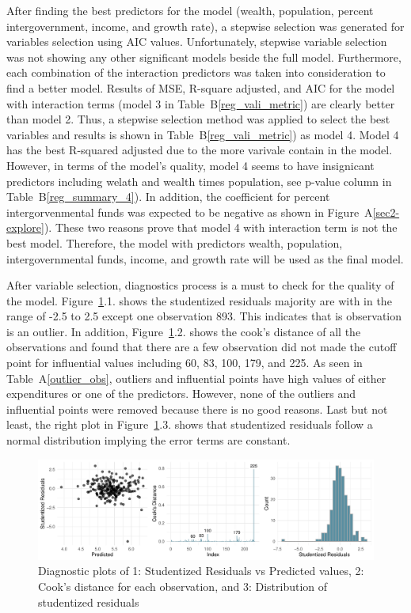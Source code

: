 \documentclass[11pt]{article}\usepackage[]{graphicx}\usepackage[]{color}
\makeatletter
\def\maxwidth{ %
  \ifdim\Gin@nat@width>\linewidth
    \linewidth
  \else
    \Gin@nat@width
  \fi
}
\makeatother
\begin{document}
\noindent After finding the best predictors for the model (wealth, population, percent intergovernment, income, and growth rate), a stepwise selection was generated for variables selection using AIC values. Unfortunately, stepwise variable selection was not showing any other significant models beside the full model. Furthermore, each combination of the interaction predictors was taken into consideration to find a better model. Results of MSE, R-square adjusted, and AIC for the model with interaction terms (model 3 in Table~B\ref{reg_vali_metric}) are clearly better than model 2. Thus, a stepwise selection method was applied to select the best variables and results is shown in Table~B\ref{reg_vali_metric}) as model 4. Model 4 has the best R-squared adjusted due to the more varivale contain in the model. However, in terms of the model's quality, model 4 seems to have insignicant predictors including welath and wealth times population, see p-value column in Table~B\ref{reg_summary_4}). In addition, the coefficient for percent intergorvenmental funds was expected to be negative as shown in Figure~A\ref{sec2-explore}). These two reasons prove that model 4 with interaction term is not the best model. Therefore, the model with predictors wealth, population, intergovernmental funds, income, and growth rate will be used as the final model.

\noindent After variable selection, diagnostics process is a must to check for the quality of the model. Figure~\ref{diag-plot1}.1. shows the studentized residuals majority are with in the range of -2.5 to 2.5 except one observation 893. This indicates that is observation is an outlier. In addition, Figure~\ref{diag-plot1}.2. shows the cook's distance of all the observations and found that there are a few observation did not made the cutoff point for influential values including 60, 83, 100, 179, and 225. As seen in Table~A\ref{outlier_obs}, outliers and influential points have high values of either expenditures or one of the predictors. However, none of the outliers and influential points were removed because there is no good reasons. Last but not least, the right plot in Figure~\ref{diag-plot1}.3. shows that studentized residuals follow a normal distribution implying the error terms are constant.    

\begin{figure}[h!] 
\begin{center}

\includegraphics[width=\maxwidth]{figure/unnamed-chunk-5-1} 

\caption{Diagnostic plots of 1: Studentized Residuals vs Predicted values, 2: Cook's distance for each observation, and 3: Distribution of studentized residuals}
\label{diag-plot1}
\end{center} 
\end{figure}
\end{document}
